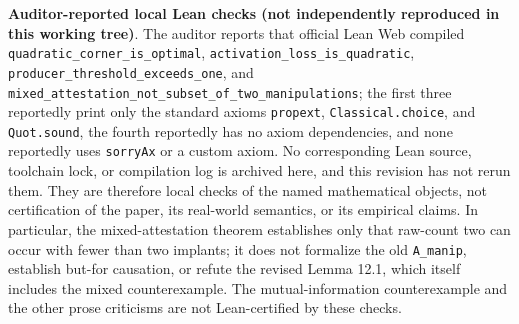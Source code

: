 \documentclass[
  11pt]{article}
\begin{document}
\textbf{Auditor-reported local Lean checks (not independently reproduced
in this working tree)}. The auditor reports that official Lean Web
compiled \texttt{quadratic\_corner\_is\_optimal},
\texttt{activation\_loss\_is\_quadratic},
\texttt{producer\_threshold\_exceeds\_one}, and
\texttt{mixed\_attestation\_not\_subset\_of\_two\_manipulations}; the
first three reportedly print only the standard axioms \texttt{propext},
\texttt{Classical.choice}, and \texttt{Quot.sound}, the fourth
reportedly has no axiom dependencies, and none reportedly uses
\texttt{sorryAx} or a custom axiom. No corresponding Lean source,
toolchain lock, or compilation log is archived here, and this revision
has not rerun them. They are therefore local checks of the named
mathematical objects, not certification of the paper, its real-world
semantics, or its empirical claims. In particular, the mixed-attestation
theorem establishes only that raw-count two can occur with fewer than
two implants; it does not formalize the old \texttt{A\_manip}, establish
but-for causation, or refute the revised Lemma 12.1, which itself
includes the mixed counterexample. The mutual-information counterexample
and the other prose criticisms are not Lean-certified by these checks.
\end{document}
